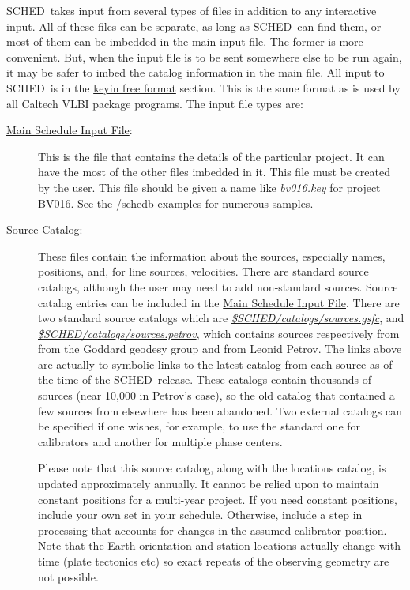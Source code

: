 \documentclass{report}
\newcommand{\schedb}{{\sc SCHED~}}
\begin{document}
\schedb takes input from several types of files in addition to any
interactive input.  All of these files can be separate, as long as
\schedb can find them, or most of them can be imbedded in the main
input file.  The former is more convenient.  But, when the input file
is to be sent somewhere else to be run again, it may be safer to imbed
the catalog information in the main file.  All input to \schedb is in
the
\hyperref[SEC:KEYIN]{keyin free format}
section.
This is the same format as is used by all Caltech VLBI
package programs.  The input file types are:

\begin{description}

\item[
{\hyperref[SEC:SCHPAR]{Main Schedule Input File}}:] This is the
file that contains the details of the particular project.  It can have
the most of the other files imbedded in it.  This file must be created
by the user.  This file should be given a name like {\sl bv016.key}
for project BV016.  See 
{\href{examples}{the /schedb examples}} for numerous samples.



\item[ {\hyperref[SEC:SRCCAT]{Source Catalog}}:] These files contain
the information about the sources, especially names, positions, and,
for line sources, velocities.  There are standard source catalogs,
although the user may need to add non-standard sources.  Source
catalog entries can be included in the {\hyperref[SEC:SCHPAR]{Main
Schedule Input File}}.  There are two standard source catalogs which
are {\href{catalogs/sources.gsfc}{{\sl
\$SCHED/catalogs/sources.gsfc}}}, and
{\href{catalogs/sources.petrov}{{\sl
\$SCHED/catalogs/sources.petrov}}}, which contains sources
respectively from from the Goddard geodesy group and from Leonid
Petrov.  The links above are actually to symbolic links to the latest
catalog from each source as of the time of the \schedb release.  These
catalogs contain thousands of sources (near 10,000 in Petrov's case),
so the old catalog that contained a few sources from elsewhere has
been abandoned.  Two external catalogs can be specified if one wishes,
for example, to use the standard one for calibrators and another for
multiple phase centers.

Please note that this source catalog, along with the locations catalog, is
updated approximately annually.  It cannot be relied upon to maintain
constant positions for a multi-year project.  If you need constant
positions, include your own set in your schedule.  Otherwise, include
a step in processing that accounts for changes in the assumed
calibrator position.  Note that the Earth orientation and station
locations actually change with time (plate tectonics etc) so
exact repeats of the observing geometry are not possible.


\end{description}
\end{document}
